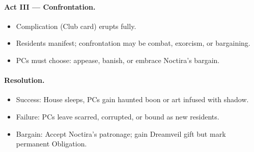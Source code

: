 \documentclass[11pt]{article}
\begin{document}
\paragraph{Act III — Confrontation.}
\begin{itemize}
  \item Complication (Club card) erupts fully.
  \item Residents manifest; confrontation may be combat, exorcism, or bargaining.
  \item PCs must choose: appease, banish, or embrace Noctira’s bargain.
\end{itemize}

\paragraph{Resolution.}
\begin{itemize}
  \item Success: House sleeps, PCs gain haunted boon or art infused with shadow.
  \item Failure: PCs leave scarred, corrupted, or bound as new residents.
  \item Bargain: Accept Noctira’s patronage; gain Dreamveil gift but mark permanent Obligation.
\end{itemize}
\end{document}
